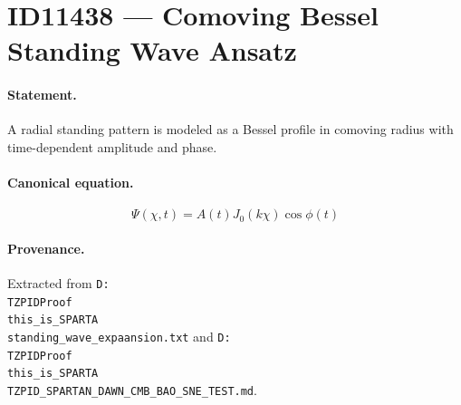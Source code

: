 \section*{ID11438 --- Comoving Bessel Standing Wave Ansatz}

\paragraph{Statement.}
A radial standing pattern is modeled as a Bessel profile in comoving radius with time-dependent amplitude and phase.

\paragraph{Canonical equation.}
\[
\Psi(\chi,t)=A(t)J_0(k\chi)\cos\phi(t)
\]

\paragraph{Provenance.}
Extracted from \texttt{D:\\TZPIDProof\\this\_is\_SPARTA\\standing\_wave\_expaansion.txt} and \texttt{D:\\TZPIDProof\\this\_is\_SPARTA\\TZPID\_SPARTAN\_DAWN\_CMB\_BAO\_SNE\_TEST.md}.
